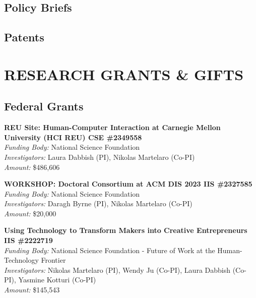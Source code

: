 \documentclass[11pt]{article} %
\begin{document}
\subsection*{Policy Briefs}
\begin{refsection}
\nocite{*}
\printbibliography[heading=none]
\end{refsection}

\subsection*{Patents}
\begin{refsection}
\nocite{*}
\printbibliography[heading=none]
\end{refsection}

\section*{RESEARCH GRANTS \& GIFTS}
\subsection*{Federal Grants}

\textbf{REU Site: Human-Computer Interaction at Carnegie Mellon University (HCI REU) CSE \#2349558}\\
\textit{Funding Body:} National Science Foundation \\
\textit{Investigators:} Laura Dabbish (PI), Nikolas Martelaro (Co-PI)\\
\textit{Amount:} \$486,606
\medskip

\textbf{WORKSHOP: Doctoral Consortium at ACM DIS 2023 IIS \#2327585}\\
\textit{Funding Body:} National Science Foundation \\
\textit{Investigators:} Daragh Byrne (PI), Nikolas Martelaro (Co-PI)\\
\textit{Amount:} \$20,000
\medskip

\textbf{Using Technology to Transform Makers into Creative Entrepreneurs IIS \#2222719}\\
\textit{Funding Body:} National Science Foundation - Future of Work at the Human-Technology Frontier\\
\textit{Investigators:} Nikolas Martelaro (PI), Wendy Ju (Co-PI), Laura Dabbish (Co-PI), Yasmine Kotturi (Co-PI)\\
\textit{Amount:} \$145,543
\medskip
\end{document}
